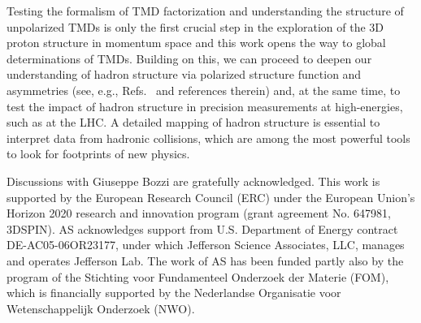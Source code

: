 \documentclass[aps,preprintnumbers,showpacs,nofootinbib,superscriptaddress,floatfix]{revtex4}
\begin{document}
Testing the formalism of TMD factorization and understanding the structure of unpolarized TMDs is only the first crucial step in the exploration of the 3D proton structure in momentum space and this work opens the way to global determinations of TMDs. 
Building on this, we can proceed to deepen our understanding of hadron
structure via polarized structure function and asymmetries (see, e.g.,
Refs.~\cite{Aschenauer:2015ndk,Boglione:2015zyc} and references therein) and, at the
same time, to test the impact of hadron structure in precision measurements at
high-energies, such as at the LHC. A detailed mapping of hadron structure is
essential to interpret data from hadronic collisions, which are among the most
powerful tools to look for footprints of new physics. 






\begin{acknowledgments}
Discussions with Giuseppe Bozzi are gratefully acknowledged.
This work is supported by the European Research Council (ERC) under the European Union's Horizon 2020 research and innovation program (grant agreement No. 647981, 3DSPIN). 
AS acknowledges support from U.S. Department of Energy contract DE-AC05-06OR23177, under which Jefferson Science Associates, LLC, manages and operates Jefferson Lab. 
The work of AS has been funded partly also by the program of the Stichting voor Fundamenteel Onderzoek der Materie (FOM), which is financially supported by the Nederlandse Organisatie voor Wetenschappelijk Onderzoek (NWO).
\end{acknowledgments}
%
%

%

%
%
\end{document}
